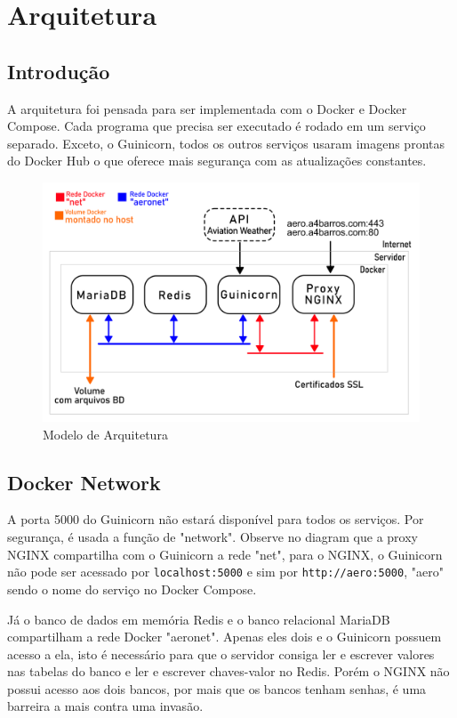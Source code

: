 \chapter{Arquitetura}

\section{Introdução}
A arquitetura foi pensada para ser implementada com o Docker e Docker Compose. Cada
programa que precisa ser executado é rodado em um serviço separado. Exceto, o Guinicorn,
todos os outros serviços usaram imagens prontas do Docker Hub o que oferece mais segurança
com as atualizações constantes.

\begin{figure}[ht]
    \begin{center}
    \includegraphics[width=\linewidth]{img/diagrama-arquitetura.png}
    \caption{Modelo de Arquitetura}
    \label{fig:arquitetura}
    \end{center}
\end{figure}

\section{Docker Network}
A porta 5000 do Guinicorn não estará disponível para todos os serviços. Por segurança, é usada a função de
"network". Observe no diagram que a proxy NGINX compartilha com o Guinicorn a rede "net", para o NGINX,
o Guinicorn não pode ser acessado por \texttt{localhost:5000} e sim por \texttt{http://aero:5000}, "aero"
sendo o nome do serviço no Docker Compose.

Já o banco de dados em memória Redis e o banco relacional MariaDB compartilham a rede Docker "aeronet".
Apenas eles dois e o Guinicorn possuem acesso a ela, isto é necessário para que o servidor consiga ler
e escrever valores nas tabelas do banco e ler e escrever chaves-valor no Redis. Porém o NGINX não possui
acesso aos dois bancos, por mais que os bancos tenham senhas, é uma barreira a mais contra uma invasão.

